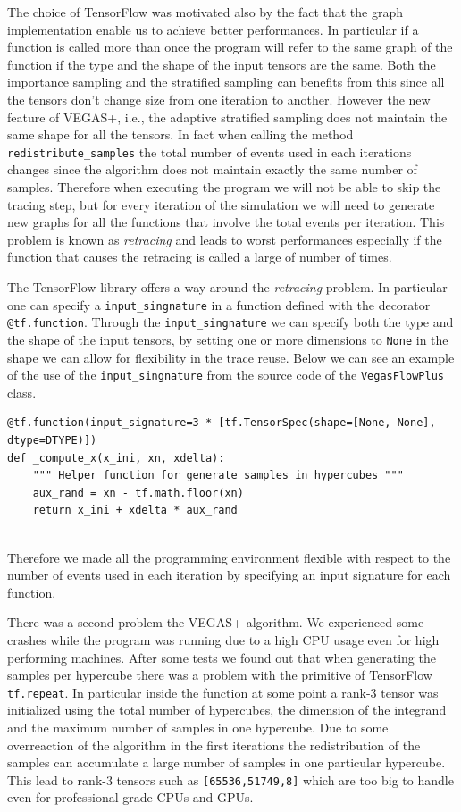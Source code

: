 \documentclass[../main/main.tex]{subfiles}
\begin{document}
The choice of TensorFlow was motivated also by the fact that the graph implementation enable us to achieve better performances. In particular if a function is called more than once the program will refer to the same graph of the function if the type and the shape of the input tensors are the same.
Both the importance sampling and the stratified sampling can benefits from this since all the tensors don't change size from one iteration to another. However the new feature of VEGAS+, i.e., the adaptive stratified sampling does not maintain the same shape for all the tensors.
In fact when calling the method \texttt{redistribute\_samples} the total number of events used in each iterations changes since the algorithm does not maintain exactly the same number of samples.
Therefore when executing the program we will not be able to skip the tracing step, but for every iteration of the simulation we will  need to generate new graphs for all the functions that involve the total events per iteration. This problem is known as \emph{retracing} and leads to worst performances especially if the function that causes the retracing is called a large of number of times.

The TensorFlow library offers a way around the \emph{retracing} problem.
In particular one can specify a \texttt{input\_singnature} in a function defined with the decorator \texttt{@tf.function}.
Through the \texttt{input\_singnature} we can specify both the type and the shape of the input tensors, by setting one or more dimensions to \texttt{None} in the shape we can allow for flexibility in the trace reuse. Below we can see an example of the use of the \texttt{input\_singnature} from the source code of the \texttt{VegasFlowPlus} class.
\begin{verbatim}
@tf.function(input_signature=3 * [tf.TensorSpec(shape=[None, None], dtype=DTYPE)])
def _compute_x(x_ini, xn, xdelta):
	""" Helper function for generate_samples_in_hypercubes """
	aux_rand = xn - tf.math.floor(xn)
	return x_ini + xdelta * aux_rand
	
\end{verbatim}
Therefore we made all the programming environment flexible with respect to the number of events used in each iteration by specifying an input signature for each function.

There was a second problem the VEGAS+ algorithm.
We experienced some crashes while the program was running due to a high CPU usage even for high performing machines. After some tests we found out that when generating the samples per hypercube there was a problem with the primitive of TensorFlow \texttt{tf.repeat}. In particular inside the function at some point a rank-3 tensor was initialized using the total number of hypercubes, the dimension of the integrand and the maximum number of samples in one hypercube. Due to some overreaction of the algorithm in the first iterations the redistribution of the samples can accumulate a large number of samples in one particular hypercube. This lead to rank-3 tensors such as \texttt{[65536,51749,8]} which are too big to handle even for professional-grade CPUs and GPUs.
\end{document}
